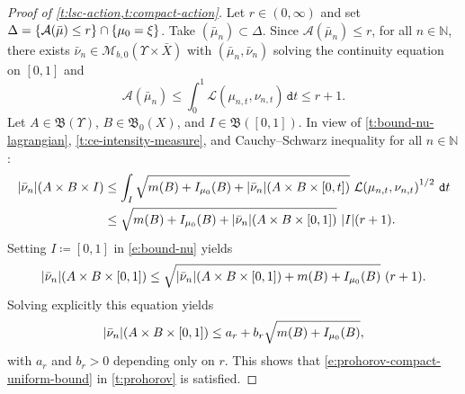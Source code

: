 \documentclass[JEP,XML,SOM,Unicode,published]{cedram}
\theoremstyle{definition}
\theoremstyle{remark}
\DeclarePairedDelimiter{\set}{\lbrace}{\rbrace}
\DeclarePairedDelimiter{\abs}{\lvert}{\rvert}
\begin{document}
\begin{proof}[Proof of {\cref{t:lsc-action,t:compact-action}}]
Let $r \in (0,\infty)$ and set $\Delta = \set{ \mathcal{A}(\bar{\mu}) \leq r } \cap \set{ \mu_{0} = \xi }$.
Take $(\bar{\mu}_{n}) \subset \Delta$.
Since $\mathcal{A}(\bar{\mu}_{n}) \leq r$, for all $n \in \mathbb{N}$, there exists $\bar{\nu}_{n} \in \mathscr{M}_{b,0}(\varUpsilon \times \bar{X})$ with $(\bar{\mu}_{n}, \bar{\nu}_{n})$ solving the continuity equation on $[0,1]$ and
\begin{equation*}
\mathcal{A}(\bar{\mu}_{n}) \le \int_{0}^{1} \mathcal{L}(\mu_{n,t}, \nu_{n,t})\, \mathtt{d} t \leq r + 1.
\end{equation*}
Let $A \in \mathfrak{B}(\varUpsilon)$, $B \in \mathfrak{B}_{0}(X)$, and $I \in \mathfrak{B}([0,1])$.
In view of \cref{t:bound-nu-lagrangian}, \cref{t:ce-intensity-measure}, and Cauchy--Schwarz inequality for all $n \in \mathbb{N}$:
\begin{equation}\label{e:bound-nu}
\begin{split}
\abs{\bar{\nu}_{n}}(A \times B \times I) & \leq \int_{I} \sqrt{m(B) + I_{\mu_{0}}(B) + \abs{\bar{\nu}_{n}}(A \times B \times [0,t])} \ {\mathcal{L}(\mu_{n,t}, \nu_{n,t})}^{1/2} \ \mathtt{d} t \\
& \leq \sqrt{m(B) + I_{\mu_{0}}(B) + \abs{\bar{\nu}_{n}}(A \times B \times [0,1])} \ \abs[big]{I} (r+1).
\end{split}
\end{equation}
Setting $I \coloneq [0,1]$ in \cref{e:bound-nu} yields
\begin{equation*}
\abs{\bar{\nu}_{n}}(A \times B \times [0,1]) \leq \sqrt{\abs{\bar{\nu}_{n}}(A \times B \times [0,1]) + m(B) + I_{\mu_{0}}(B)} \ (r+1).
\end{equation*}
Solving explicitly this equation yields
\begin{equation}\label{e:bound-nu-total-mass}
\abs{\bar{\nu}_{n}}(A \times B \times [0,1]) \leq a_{r} + b_{r} \sqrt{m(B) + I_{\mu_{0}}(B)},
\end{equation}
with $a_{r}$ and $b_{r} > 0$ depending only on $r$.
This shows that \cref{e:prohorov-compact-uniform-bound} in \cref{t:prohorov} is satisfied.


\end{proof}
\end{document}
